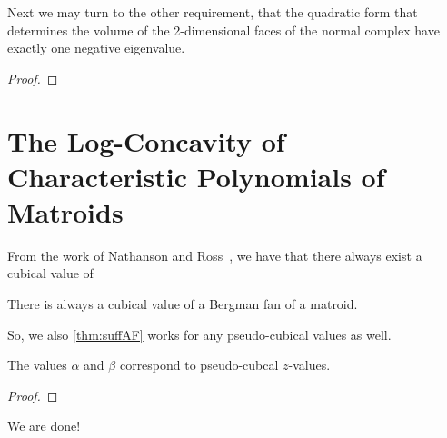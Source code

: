 \documentclass[12pt,oneside]{../../sfsuthesis}
\begin{document}
Next we may turn to the other requirement, that the quadratic form that determines the volume of the 2-dimensional faces of the normal complex have exactly one negative eigenvalue.

\begin{lemma}\th\label{thm:matroidNegEigen}

\end{lemma}
\begin{proof}
\end{proof}

\section{The Log-Concavity of Characteristic Polynomials of Matroids}

\begin{Result}
\end{Result}

From the work of Nathanson and Ross~\cite{nathansonTropicalFansNormal2021}, we have that there always exist a cubical value of
\begin{lemma}
    There is always a cubical value of a Bergman fan of a matroid.
\end{lemma}
So, we also \th\ref{thm:suffAF} works for any pseudo-cubical values as well.

\begin{lemma}
    The values \( \alpha \) and \( \beta \) correspond to pseudo-cubcal \( z \)-values.
\end{lemma}
\begin{proof}
\end{proof}

We are done!
\end{document}
